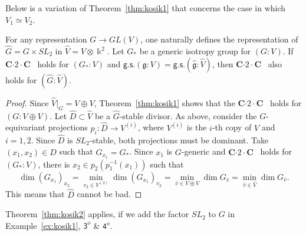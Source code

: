 Below is a variation of Theorem~\ref{thm:kosik1} that concerns the case in which $V_1\simeq V_2$.

\begin{thm}   \label{thm:kosik2}
For any representation $G\to GL(V)$, one naturally defines the representation of $\hat G=G\times SL_2$ in 
$\hat V=V\otimes {\Bbbk}^2$. Let $G_\ast$ be a generic isotropy group for $(G:V)$. If {\textsf{\bfseries C${\cdot}2{\cdot}$C}\ } holds for 
$(G_\ast: V)$ and $\mathsf{g.s.}({{\mathfrak g}}:V)=\mathsf{g.s.}(\hat {{\mathfrak g}}:\hat V)$, then 
{\textsf{\bfseries C${\cdot}2{\cdot}$C}\ } also holds for $(\hat G:\hat V)$. 
\end{thm}
\begin{proof}
Since $\hat V\vert_{G}=V\oplus V$,  Theorem~\ref{thm:kosik1} shows that the {\textsf{\bfseries C${\cdot}2{\cdot}$C}\ } holds for
$(G:V\oplus V)$.  Let $\hat D\subset \hat V$ be a  $\hat G$-stable divisor. As above, 
consider the $G$-equivariant projections $p_i:\hat D\to V^{(i)}$, where $V^{(i)}$ is the $i$-th copy of $V$ and $i=1,2$. Since $\hat D$ 
is $SL_2$-stable, both projections must be dominant. Take $(x_1,x_2)\in \hat D$ such that  
$G_{x_1}=G_\ast$. Since $x_1$ is $G$-generic and {\textsf{\bfseries C${\cdot}2{\cdot}$C}\ } holds for $(G_\ast: V)$,  there is $x_2\in p_2(p_1^{-1}(x_1))$ such that
\[
  \dim (G_{x_1})_{x_2}=\min_{v_2\in V^{(2)}}\dim (G_{x_1})_{v_2}=\min_{\bar v\in V\oplus V}\dim G_{\bar v}=
  \min_{\hat v\in \hat V} \dim G_{\hat v} .
\]
This means that $\hat D$ cannot be bad.
\end{proof}

\begin{ex}   \label{ex:plus-SL2}
Theorem~\ref{thm:kosik2} applies, if we add the factor $SL_2$ to $G$ in Example~\ref{ex:kosik1},
${\mathsf 3^o}$ \& ${\mathsf 4^o}$.
\end{ex}

